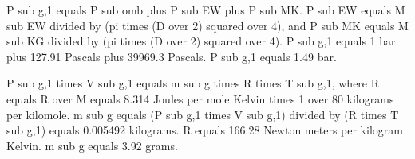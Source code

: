 P sub g,1 equals P sub omb plus P sub EW plus P sub MK.
P sub EW equals M sub EW divided by (pi times (D over 2) squared over 4), and P sub MK equals M sub KG divided by (pi times (D over 2) squared over 4).
P sub g,1 equals 1 bar plus 127.91 Pascals plus 39969.3 Pascals.
P sub g,1 equals 1.49 bar.

P sub g,1 times V sub g,1 equals m sub g times R times T sub g,1, where R equals R over M equals 8.314 Joules per mole Kelvin times 1 over 80 kilograms per kilomole.
m sub g equals (P sub g,1 times V sub g,1) divided by (R times T sub g,1) equals 0.005492 kilograms.
R equals 166.28 Newton meters per kilogram Kelvin.
m sub g equals 3.92 grams.